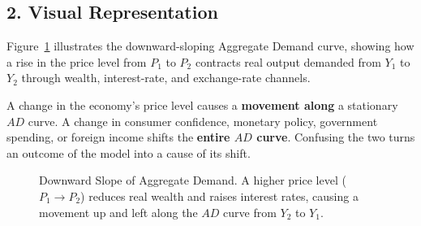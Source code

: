 \documentclass[11pt,letterpaper]{article}
\begin{document}
\subsection*{2. Visual Representation}
Figure~\ref{fig:ad_curve_derivation} illustrates the downward-sloping Aggregate Demand curve, showing how a rise in the price level from $P_1$ to $P_2$ contracts real output demanded from $Y_1$ to $Y_2$ through wealth, interest-rate, and exchange-rate channels.

\begin{tcolorbox}[colback=yellow!10!white,colframe=orange!80!black,title=\textbf{Clear It Up: Price Level Versus Aggregate Demand}]
A change in the economy's price level causes a \textbf{movement along} a stationary $AD$ curve. A change in consumer confidence, monetary policy, government spending, or foreign income shifts the \textbf{entire $AD$ curve}. Confusing the two turns an outcome of the model into a cause of its shift.
\end{tcolorbox}

\begin{figure}[htbp]
\centering
{}
\caption{Downward Slope of Aggregate Demand. A higher price level ($P_1 \to P_2$) reduces real wealth and raises interest rates, causing a movement up and left along the $AD$ curve from $Y_2$ to $Y_1$.}
\label{fig:ad_curve_derivation}
\end{figure}
\end{document}
